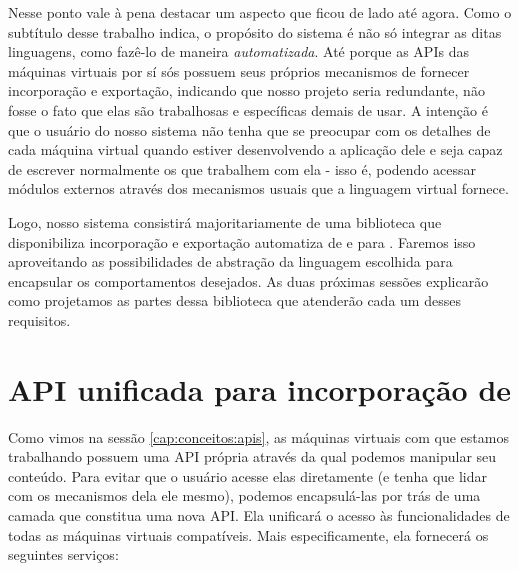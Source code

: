 
    Nesse ponto vale à pena destacar um aspecto que ficou de lado até agora.
    Como o subtítulo desse trabalho indica, o propósito do sistema é não só
    integrar as ditas linguagens, como fazê-lo de maneira \textit{automatizada}.
    Até porque as APIs das máquinas virtuais por sí sós possuem seus próprios
    mecanismos de fornecer incorporação e exportação, indicando que nosso
    projeto seria redundante, não fosse o fato que elas são trabalhosas e
    específicas demais de usar. A intenção é que o usuário do nosso sistema não
    tenha que se preocupar com os detalhes de cada máquina virtual quando
    estiver desenvolvendo a aplicação dele e seja capaz de escrever normalmente
    os  que trabalhem com ela - isso é, podendo acessar módulos
    externos através dos mecanismos usuais que a linguagem virtual fornece.

    Logo, nosso sistema consistirá majoritariamente de uma biblioteca \CXX{}
    que disponibiliza incorporação e exportação automatiza de e para .
    Faremos isso aproveitando as possibilidades de abstração da linguagem
    escolhida para encapsular os comportamentos desejados. As duas próximas
    sessões explicarão como projetamos as partes dessa biblioteca que atenderão
    cada um desses requisitos.

  \section{API unificada para incorporação de }
  \label{sec:estrutura:opa}

    Como vimos na sessão \ref{cap:conceitos:apis}, as máquinas virtuais com que
    estamos trabalhando possuem uma API própria através da qual podemos
    manipular seu conteúdo. Para evitar que o usuário acesse elas diretamente
    (e tenha que lidar com os mecanismos dela ele mesmo), podemos encapsulá-las
    por trás de uma camada que constitua uma nova API. Ela unificará o acesso às
    funcionalidades de todas as máquinas virtuais compatíveis. Mais
    especificamente, ela fornecerá os seguintes serviços:

